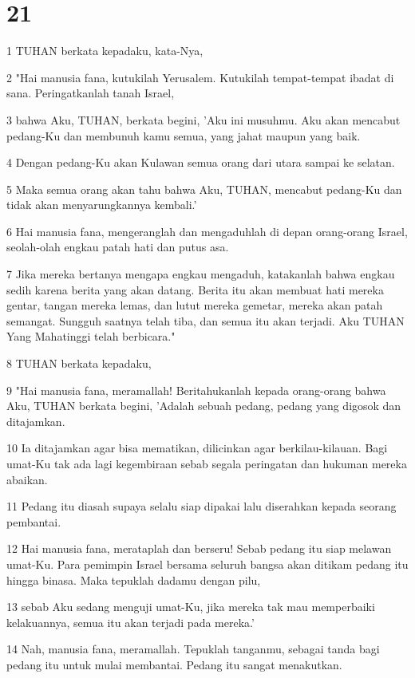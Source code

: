 \chapter{21}

\par 1 TUHAN berkata kepadaku, kata-Nya,
\par 2 "Hai manusia fana, kutukilah Yerusalem. Kutukilah tempat-tempat ibadat di sana. Peringatkanlah tanah Israel,
\par 3 bahwa Aku, TUHAN, berkata begini, 'Aku ini musuhmu. Aku akan mencabut pedang-Ku dan membunuh kamu semua, yang jahat maupun yang baik.
\par 4 Dengan pedang-Ku akan Kulawan semua orang dari utara sampai ke selatan.
\par 5 Maka semua orang akan tahu bahwa Aku, TUHAN, mencabut pedang-Ku dan tidak akan menyarungkannya kembali.'
\par 6 Hai manusia fana, mengeranglah dan mengaduhlah di depan orang-orang Israel, seolah-olah engkau patah hati dan putus asa.
\par 7 Jika mereka bertanya mengapa engkau mengaduh, katakanlah bahwa engkau sedih karena berita yang akan datang. Berita itu akan membuat hati mereka gentar, tangan mereka lemas, dan lutut mereka gemetar, mereka akan patah semangat. Sungguh saatnya telah tiba, dan semua itu akan terjadi. Aku TUHAN Yang Mahatinggi telah berbicara."
\par 8 TUHAN berkata kepadaku,
\par 9 "Hai manusia fana, meramallah! Beritahukanlah kepada orang-orang bahwa Aku, TUHAN berkata begini, 'Adalah sebuah pedang, pedang yang digosok dan ditajamkan.
\par 10 Ia ditajamkan agar bisa mematikan, dilicinkan agar berkilau-kilauan. Bagi umat-Ku tak ada lagi kegembiraan sebab segala peringatan dan hukuman mereka abaikan.
\par 11 Pedang itu diasah supaya selalu siap dipakai lalu diserahkan kepada seorang pembantai.
\par 12 Hai manusia fana, merataplah dan berseru! Sebab pedang itu siap melawan umat-Ku. Para pemimpin Israel bersama seluruh bangsa akan ditikam pedang itu hingga binasa. Maka tepuklah dadamu dengan pilu,
\par 13 sebab Aku sedang menguji umat-Ku, jika mereka tak mau memperbaiki kelakuannya, semua itu akan terjadi pada mereka.'
\par 14 Nah, manusia fana, meramallah. Tepuklah tanganmu, sebagai tanda bagi pedang itu untuk mulai membantai. Pedang itu sangat menakutkan.
